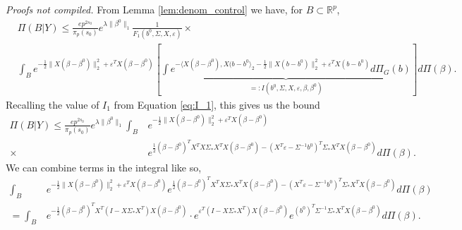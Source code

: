 \documentclass[11pt]{article}
\renewenvironment{proof}[1]{\par\noindent{\bf #1 \ }}{\hfill\BlackBox\\[2mm]}
\renewenvironment{proof}[1]{\textit{Proofs not compiled.}}{}
\newcommand{\eps}{\varepsilon}
\newcommand{\R}{\mathbb{R}}
\newcommand{\bezero}{\beta^0}
\newcommand{\Pig}{\Pi_{G}}
\newcommand{\postCov}{\Sigma_*}
\begin{document}
\begin{proof}{Proof of Theorem \ref{thm:dimension}.}
From Lemma \ref{lem:denom_control} we have, for $B \subset \R^p$,
\begin{align*}
&\Pi(B | Y) \leq \frac{e p^{2s_0}}{\pi_p(s_0)}e^{\lambda\|\beta^0\|_1} \frac{1}{F_1(b^0, \Sigma, X, \eps)}\times\\
&\int_B e^{-\frac{1}{2}\|X(\beta - \bezero)\|_2^2 + \eps^T X(\beta - \bezero)}\left[\underbrace{\int e^{-\langle X(\beta - \bezero), X(b - b^0\rangle_2 - \frac{1}{2}\|X(b - b^0)\|_2^2 + \eps^T X(b - b^0)} d\Pig(b)}_{=: I(b^0, \Sigma, X, \eps, \beta, \bezero)} \right]d\Pi(\beta) .
\end{align*}
Recalling the value of $I_1$ from Equation \eqref{eq:I_1}, this gives us the bound
\begin{align*}
\Pi(B | Y) \leq \frac{e p^{2s_0}}{\pi_p(s_0)}e^{\lambda\|\beta^0\|_1} \int_B& e^{-\frac{1}{2}\|X(\beta - \bezero)\|_2^2 + \eps^T X(\beta - \bezero)} \\
\times&e^{\frac{1}{2}(\beta - \beta^0)^T X^TX \postCov X^TX(\beta - \beta^0)  - (X^T\eps - \Sigma^{-1}b^0)^T\postCov X^TX(\beta - \beta^0)} d\Pi(\beta).	
\end{align*}
We can combine terms in the integral like so,
\begin{align}
\int_B & e^{-\frac{1}{2}\|X(\beta - \bezero)\|_2^2 + \eps^T X(\beta - \bezero)} e^{\frac{1}{2}(\beta - \beta^0)^T X^TX \postCov X^TX(\beta - \beta^0)  - (X^T\eps - \Sigma^{-1}b^0)^T\postCov X^TX(\beta - \beta^0)} d\Pi(\beta) \nonumber\\
=\int_B &e^{-\frac{1}{2}(\beta - \bezero)^T X^T\left(I - X\postCov X^T \right)X(\beta - \bezero)} 
\cdot  e^{\eps^T (I - X\postCov  X^T)X(\beta - \bezero)} e^{(b^0)^T\Sigma^{-1}\postCov  X^TX (\beta - \bezero)} d\Pi(\beta). \label{eq:int_bound_A}

\end{align}
\end{proof}
\end{document}
